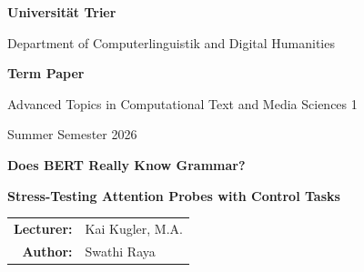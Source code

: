 \documentclass[12pt,a4paper]{article}
\begin{document}

\begin{titlepage}
    \thispagestyle{empty}

    \begin{center}

        {\Large\textbf{Universität Trier}\par}

        \vspace{0.3cm}

        {\large Department of Computerlinguistik and Digital Humanities\par}

        \vspace{0.15cm}

        \vspace{1.8cm}

        {\large\textbf{Term Paper}\par}

        \vspace{0.5cm}

        {\large
        Advanced Topics in Computational Text and Media Sciences 1
        \par}

        \vspace{0.25cm}

        {\normalsize Summer Semester 2026\par}

        \vspace{2cm}

        {\LARGE\bfseries
        Does BERT Really Know Grammar?
        \par}

        \vspace{0.4cm}

        {\Large\bfseries
        Stress-Testing Attention Probes with Control Tasks
        \par}

        \vfill

        \begin{tabular}{@{}rl@{}}
            \textbf{Lecturer:}
            & Kai Kugler, M.A. \\[0.35cm]

            \textbf{Author:}
            & Swathi Raya \\[0.35cm]


\end{tabular}
\end{center}
\end{titlepage}
\end{document}
